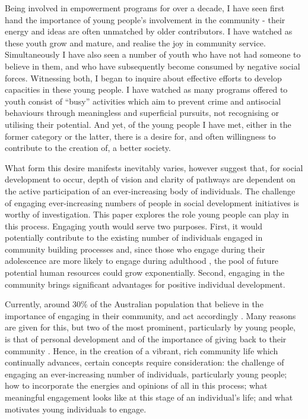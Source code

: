 Being involved in empowerment programs for over a decade, I have seen first hand the importance of young people's involvement in the community - their energy and ideas are often unmatched by older contributors. I have watched as these youth grow and mature, and realise the joy in community service. Simultaneously I have also seen a number of youth who have not had someone to believe in them, and who have subsequently become consumed by negative social forces. Witnessing both, I began to inquire about effective efforts to develop capacities in these young people. I have watched as many programs offered to youth consist of “busy” activities which aim to prevent crime and antisocial behaviours through meaningless and superficial pursuits, not recognising or utilising their potential. And yet, of the young people I have met, either in the former category or the latter, there is a desire for, and often willingness to contribute to the creation of, a better society. 


What form this desire manifests inevitably varies, however \citet{Isin2007} suggest that, for social development to occur, depth of vision and clarity of pathways are dependent on the active participation of an ever-increasing body of individuals. The challenge of engaging ever-increasing numbers of people in social development initiatives is worthy of investigation. This paper explores the role young people can play in this process. Engaging youth would serve two purposes. First, it would potentially contribute to the existing number of individuals engaged in community building processes and, since those who engage during their adolescence are more likely to engage during adulthood \citep{Zeldin2000}, the pool of future potential human resources could grow exponentially. Second, engaging in the community brings significant advantages for positive individual development. 

Currently, around 30\% of the Australian population that believe in the importance of engaging in their community, and act accordingly \citep{AustralianBureauofStatistics2015}. Many reasons are given for this, but two of the most prominent, particularly by young people, is that of personal development and of the importance of giving back to their community \citep{Perry2008, Ballard2014}. Hence, in the creation of a vibrant, rich community life which continually advances, certain concepts require consideration: the challenge of engaging an ever-increasing number of individuals, particularly young people; how to incorporate the energies and opinions of all in this process; %
what meaningful engagement looks like at this stage of an individual’s life; and what motivates young individuals to engage. 

